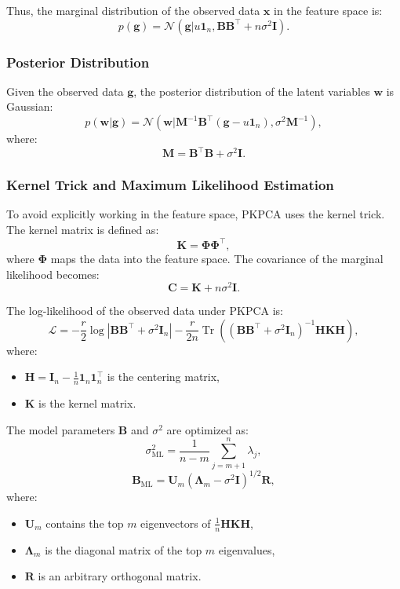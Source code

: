\documentclass{article}
\begin{document}
    Thus, the marginal distribution of the observed data \(\mathbf{x}\) in the feature space is:
    \[
    p(\mathbf{g}) = \mathcal{N}(\mathbf{g} | u \mathbf{1}_n, \mathbf{B} \mathbf{B}^\top + n\sigma^2 \mathbf{I}).
    \]
    
    \subsubsection{Posterior Distribution}
    
    Given the observed data \(\mathbf{g}\), the posterior distribution of the latent variables \(\mathbf{w}\) is Gaussian:
    \[
    p(\mathbf{w} | \mathbf{g}) = \mathcal{N}(\mathbf{w} | \mathbf{M}^{-1} \mathbf{B}^\top (\mathbf{g} - u \mathbf{1}_n), \sigma^2 \mathbf{M}^{-1}),
    \]
    where:
    \[
    \mathbf{M} = \mathbf{B}^\top \mathbf{B} + \sigma^2 \mathbf{I}.
    \]
    
    \subsubsection{Kernel Trick and Maximum Likelihood Estimation}
    
    To avoid explicitly working in the feature space, PKPCA uses the kernel trick. The kernel matrix is defined as:
    \[
    \mathbf{K} = \mathbf{\Phi} \mathbf{\Phi}^\top,
    \]
    where \(\mathbf{\Phi}\) maps the data into the feature space. The covariance of the marginal likelihood becomes:
    \[
    \mathbf{C} = \mathbf{K} + n\sigma^2 \mathbf{I}.
    \]
    
    The log-likelihood of the observed data under PKPCA is:
    \[
    \mathcal{L} = -\frac{r}{2} \log |\mathbf{B}\mathbf{B}^\top + \sigma^2 \mathbf{I}_n| - \frac{r}{2n} \operatorname{Tr} \left( (\mathbf{B}\mathbf{B}^\top + \sigma^2 \mathbf{I}_n)^{-1} \mathbf{H}\mathbf{K}\mathbf{H} \right),
    \]
    where:
    \begin{itemize}
        \item \(\mathbf{H} = \mathbf{I}_n - \frac{1}{n} \mathbf{1}_n \mathbf{1}_n^\top\) is the centering matrix,
        \item \(\mathbf{K}\) is the kernel matrix.
    \end{itemize}
    
    The model parameters \(\mathbf{B}\) and \(\sigma^2\) are optimized as:
    \[
    \sigma^2_{\text{ML}} = \frac{1}{n - m} \sum_{j=m+1}^n \lambda_j,
    \]
    \[
    \mathbf{B}_{\text{ML}} = \mathbf{U}_m (\mathbf{\Lambda}_m - \sigma^2 \mathbf{I})^{1/2} \mathbf{R},
    \]
    where:
    \begin{itemize}
        \item \(\mathbf{U}_m\) contains the top \(m\) eigenvectors of \(\frac{1}{n} \mathbf{H} \mathbf{K} \mathbf{H}\),
        \item \(\mathbf{\Lambda}_m\) is the diagonal matrix of the top \(m\) eigenvalues,
        \item \(\mathbf{R}\) is an arbitrary orthogonal matrix.
    \end{itemize}
    
\end{document}
